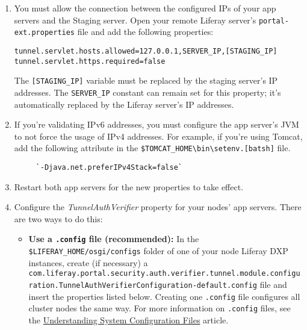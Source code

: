 \noindent\hrulefill

\begin{enumerate}
\def\labelenumi{\arabic{enumi}.}
\setcounter{enumi}{1}
\item
  You must allow the connection between the configured IPs of your app
  servers and the Staging server. Open your remote Liferay server's
  \texttt{portal-ext.properties} file and add the following properties:

\begin{verbatim}
tunnel.servlet.hosts.allowed=127.0.0.1,SERVER_IP,[STAGING_IP]
tunnel.servlet.https.required=false
\end{verbatim}

  The \texttt{{[}STAGING\_IP{]}} variable must be replaced by the
  staging server's IP addresses. The \texttt{SERVER\_IP} constant can
  remain set for this property; it's automatically replaced by the
  Liferay server's IP addresses.
\item
  If you're validating IPv6 addresses, you must configure the app
  server's JVM to not force the usage of IPv4 addresses. For example, if
  you're using Tomcat, add the following attribute in the
  \texttt{\$TOMCAT\_HOME\textbackslash{}bin\textbackslash{}setenv.{[}bat\textbar{}sh{]}}
  file.

\begin{verbatim}
     `-Djava.net.preferIPv4Stack=false`
\end{verbatim}
\item
  Restart both app servers for the new properties to take effect.
\item
  Configure the \emph{TunnelAuthVerifier} property for your nodes' app
  servers. There are two ways to do this:

  \begin{itemize}
  \item
    \textbf{Use a \texttt{.config} file (recommended):} In the
    \texttt{\$LIFERAY\_HOME/osgi/configs} folder of one of your node
    Liferay DXP instances, create (if necessary) a
    \texttt{com.liferay.portal.security.auth.verifier.tunnel.module.configuration.TunnelAuthVerifierConfiguration-default.config}
    file and insert the properties listed below. Creating one
    \texttt{.config} file configures all cluster nodes the same way. For
    more information on \texttt{.config} files, see the
    \href{/docs/7-2/user/-/knowledge_base/u/understanding-system-configuration-files}{Understanding
    System Configuration Files} article.


\end{itemize}
\end{enumerate}
